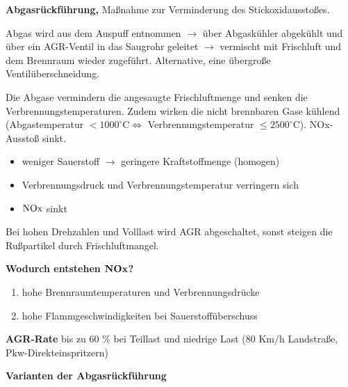 \textbf{Abgasrückführung,} Maßnahme zur Verminderung des
Stickoxidausstoßes.

Abgas wird aus dem Auspuff entnommen $\to$ über Abgaskühler abgekühlt
und über ein AGR-Ventil in das Saugrohr geleitet $\to$ vermischt mit
Frischluft und dem Brennraum wieder zugeführt. Alternative, eine
übergroße Ventilüberschneidung.

Die Abgase vermindern die angesaugte Frischluftmenge und senken die
Verbrennungstemperaturen. Zudem wirken die nicht brennbaren Gase kühlend
(Abgastemperatur $<1000^\circ\text{C} \iff$ Verbrennungstemperatur
$\le2500^\circ\text{C}$). NOx-Ausstoß sinkt.

\begin{itemize}
\item
  weniger Sauerstoff $\to$ geringere Kraftstoffmenge (homogen)
\item
  Verbrennungsdruck und Verbrennungstemperatur verringern sich
\item
  $\ce{NOx}$ sinkt
\end{itemize}

Bei hohen Drehzahlen und Volllast wird AGR abgeschaltet, sonst steigen
die Rußpartikel durch Frischluftmangel.

\textbf{Wodurch entstehen $\ce{\bold{NOx}}$?}

\begin{enumerate}
\item
  hohe Brennraumtemperaturen und Verbrennungsdrücke
\item
  hohe Flammgeschwindigkeiten bei Sauerstoffüberschuss
\end{enumerate}

\textbf{AGR-Rate} bis zu 60 \% bei Teillast und niedrige Last (80 Km/h
Landstraße, Pkw-Direkteinspritzern)

\textbf{Varianten der Abgasrückführung}

